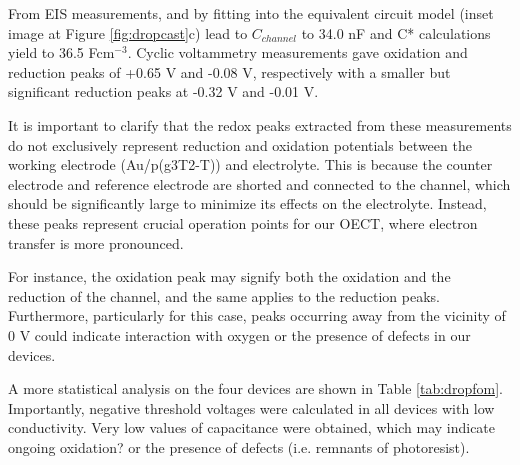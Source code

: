 From EIS measurements, and by fitting into the equivalent circuit model (inset image at Figure \ref{fig:dropcast}c) lead to $C_{channel}$ to 34.0 nF and C* calculations yield to 36.5 Fcm$^{-3}$. Cyclic voltammetry measurements gave oxidation and reduction peaks of +0.65 V and -0.08 V, respectively with a smaller but significant reduction peaks at -0.32 V and -0.01 V.

It is important to clarify that the redox peaks extracted from these measurements do not exclusively represent reduction and oxidation potentials between the working electrode (Au/p(g3T2-T)) and electrolyte. This is because the counter electrode and reference electrode are shorted and connected to the channel, which should be significantly large to minimize its effects on the electrolyte. Instead, these peaks represent crucial operation points for our OECT, where electron transfer is more pronounced.

For instance, the oxidation peak may signify both the oxidation and the reduction of the channel, and the same applies to the reduction peaks. Furthermore, particularly for this case, peaks occurring away from the vicinity of 0 V could indicate interaction with oxygen or the presence of defects in our devices.

A more statistical analysis on the four devices are shown in Table \ref{tab:dropfom}. Importantly, negative threshold voltages were calculated in all devices with low conductivity. Very low values of capacitance were obtained, which may indicate ongoing oxidation? or the presence of defects (i.e. remnants of photoresist). %



